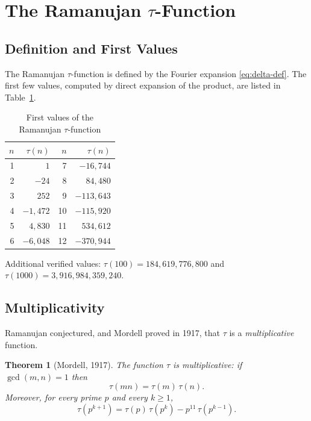 \documentclass[12pt,a4paper]{amsart}
\newtheorem{theorem}{Theorem}[section]
\theoremstyle{definition}
\begin{document}
\section{The Ramanujan $\tau$-Function}

\subsection{Definition and First Values}

The Ramanujan $\tau$-function is defined by the Fourier expansion \eqref{eq:delta-def}.
The first few values, computed by direct expansion of the product, are listed in
Table~\ref{tab:tau-values}.

\begin{table}[ht]
\centering
\caption{First values of the Ramanujan $\tau$-function}
\label{tab:tau-values}
\begin{tabular}{@{}rr@{\quad}rr@{}}
\toprule
$n$ & $\tau(n)$ & $n$ & $\tau(n)$ \\
\midrule
1  & $1$           & 7  & $-16{,}744$   \\
2  & $-24$         & 8  & $84{,}480$    \\
3  & $252$         & 9  & $-113{,}643$  \\
4  & $-1{,}472$    & 10 & $-115{,}920$  \\
5  & $4{,}830$     & 11 & $534{,}612$   \\
6  & $-6{,}048$    & 12 & $-370{,}944$  \\
\bottomrule
\end{tabular}
\end{table}

\noindent Additional verified values: $\tau(100) = 184{,}619{,}776{,}800$ and
$\tau(1000) = 3{,}916{,}984{,}359{,}240$.

\subsection{Multiplicativity}

Ramanujan conjectured, and Mordell \cite{Mordell1917} proved in 1917, that $\tau$
is a \emph{multiplicative} function.

\begin{theorem}[Mordell, 1917]\label{thm:multiplicativity}
  The function $\tau$ is multiplicative: if $\gcd(m,n)=1$ then
  \[
    \tau(mn) = \tau(m)\,\tau(n).
  \]
  Moreover, for every prime $p$ and every $k \geq 1$,
  \begin{equation}\label{eq:hecke-recurrence}
    \tau(p^{k+1}) = \tau(p)\,\tau(p^k) - p^{11}\,\tau(p^{k-1}).
  \end{equation}
\end{theorem}
\end{document}
